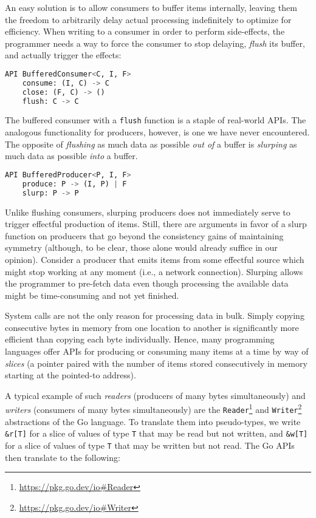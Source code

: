 \documentclass[sigplan,screen,10pt,review]{acmart}
\begin{document}
An easy solution is to allow consumers to buffer items internally, leaving them the freedom to arbitrarily delay actual processing indefinitely to optimize for efficiency. When writing to a consumer in order to perform side-effects, the programmer needs a way to force the consumer to stop delaying, \textit{flush} its buffer, and actually trigger the effects:

\begin{lstlisting}[language=Python]
API BufferedConsumer<C, I, F>
    consume: (I, C) -> C
    close: (F, C) -> ()
    flush: C -> C
\end{lstlisting}

The buffered consumer with a \texttt{flush} function is a staple of real-world APIs. The analogous functionality for producers, however, is one we have never encountered. The opposite of \textit{flushing} as much data as possible \textit{out of} a buffer is \textit{slurping} as much data as possible \textit{into} a buffer.

\begin{lstlisting}[language=Python]
API BufferedProducer<P, I, F>
    produce: P -> (I, P) | F
    slurp: P -> P
\end{lstlisting}

Unlike flushing consumers, slurping producers does not immediately serve to trigger effectful production of items. Still, there are arguments in favor of a slurp function on producers that go beyond the consistency gains of maintaining symmetry (although, to be clear, those alone would already suffice in our opinion). Consider a producer that emits items from some effectful source which might stop working at any moment (i.e., a network connection). Slurping allows the programmer to pre-fetch data even though processing the available data might be time-consuming and not yet finished.

System calls are not the only reason for processing data in bulk. Simply copying consecutive bytes in memory from one location to another is significantly more efficient than copying each byte individually. Hence, many programming languages offer APIs for producing or consuming many items at a time by way of \textit{slices} (a pointer paired with the number of items stored consecutively in memory starting at the pointed-to address).

A typical example of such \textit{readers} (producers of many bytes simultaneously) and \textit{writers} (consumers of many bytes simultaneously) are the \texttt{Reader}\footnote{\url{https://pkg.go.dev/io\#Reader}} and \texttt{Writer}\footnote{\url{https://pkg.go.dev/io\#Writer}} abstractions of the Go language. To translate them into pseudo-types, we write \texttt{\&r[T]} for a slice of values of type \texttt{T} that may be read but not written, and \texttt{\&w[T]} for a slice of values of type \texttt{T} that may be written but not read. The Go APIs then translate to the following:
\end{document}
